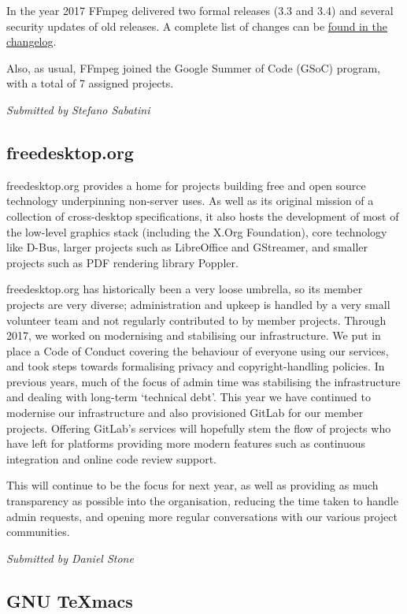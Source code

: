 \documentclass[a4paper]{report}
\begin{document}
In the year 2017 FFmpeg delivered two formal releases (3.3 and 3.4) and
several security updates of old releases. A complete list of changes can
be \href{http://git.videolan.org/?p=ffmpeg.git;a=blob_plain;f=Changelog;hb=HEAD}{found
in the changelog}.

Also, as usual, FFmpeg joined the Google Summer of Code (GSoC) program,
with a total of 7 assigned projects.

{\em Submitted by Stefano Sabatini}

\subsection{freedesktop.org}

freedesktop.org provides a home for projects building free and
open source technology underpinning non-server uses. As well as its
original mission of a collection of cross-desktop specifications, it
also hosts the development of most of the low-level graphics stack
(including the X.Org Foundation), core technology like D-Bus, larger
projects such as LibreOffice and GStreamer, and smaller projects such as
PDF rendering library Poppler.

freedesktop.org has historically been a very loose umbrella, so its
member projects are very diverse; administration and upkeep is handled
by a very small volunteer team and not regularly contributed to by
member projects. Through 2017, we worked on modernising and stabilising
our infrastructure. We put in place a Code of Conduct covering the
behaviour of everyone using our services, and took steps towards
formalising privacy and copyright-handling policies. In previous years,
much of the focus of admin time was stabilising the infrastructure and
dealing with long-term `technical debt'. This year we have continued to
modernise our infrastructure and also provisioned GitLab for our member
projects. Offering GitLab's services will hopefully stem the flow of
projects who have left for platforms providing more modern features such
as continuous integration and online code review support.

This will continue to be the focus for next year, as well as providing
as much transparency as possible into the organisation, reducing the
time taken to handle admin requests, and opening more regular
conversations with our various project communities.

{\em Submitted by Daniel Stone}

\subsection{GNU TeXmacs}
\end{document}
